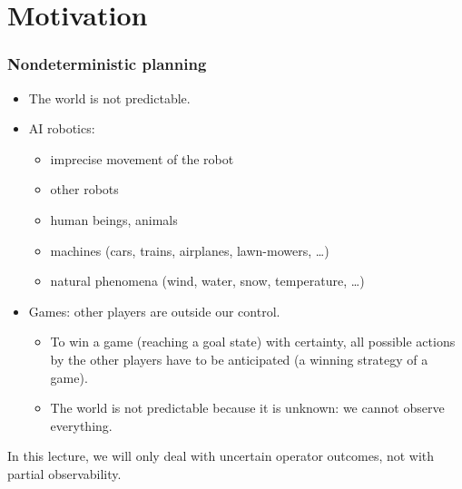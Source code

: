 \documentclass{gkibeamer}
\begin{document}
\subtitle{13.~Nondeterministic planning}
\date{January 20th, 2012}
\maketitles

\section{Motivation}

\begin{frame}
  \frametitle{Nondeterministic planning}

  \begin{itemize}
  \item The world is not predictable.
  \item 
    AI robotics:
    \begin{itemize}
    \item imprecise movement of the robot
    \item other robots
    \item human beings, animals
    \item machines (cars, trains, airplanes, lawn-mowers, \dots)
    \item natural phenomena (wind, water, snow, temperature, \dots)
    \end{itemize}
  \item 
    Games: other players are outside our control.
    \begin{itemize}
    \item To win a game (reaching a goal state) with certainty, all
      possible actions by the other players have to be anticipated (a
      \alert{winning strategy} of a game).
    \item The world is not predictable because it is unknown:
      we cannot \alert{observe} everything.
    \end{itemize}
  \end{itemize}

  \smallskip

  In this lecture, we will only deal with uncertain operator outcomes,
  not with partial observability.
\end{frame}
\end{document}
